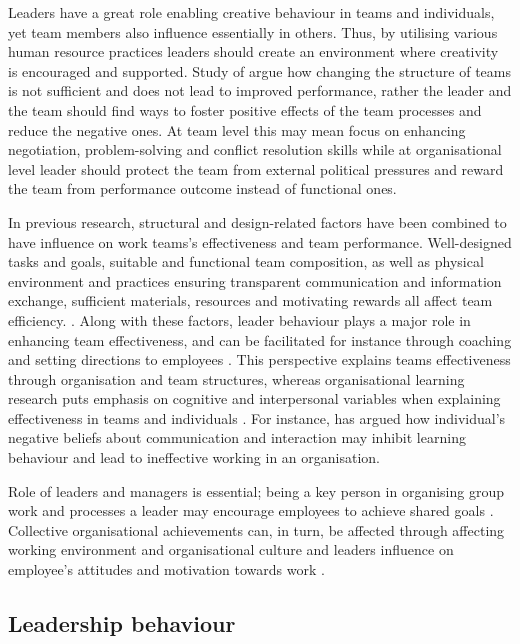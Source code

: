 Leaders have a great role enabling creative behaviour in teams and individuals, yet team members also influence essentially in others. Thus, by utilising various human resource practices leaders should create an environment where creativity is encouraged and supported. \citep{shalley2004leaders} Study of \citet{ancona1992demography} argue how changing the structure of teams is not sufficient and does not lead to improved performance, rather the leader and the team should find ways to foster positive effects of the team processes and reduce the negative ones. At team level this may mean focus on enhancing negotiation, problem-solving and conflict resolution skills while at organisational level leader should protect the team from external political pressures and reward the team from performance outcome instead of functional ones. \citep{ancona1992demography}

In previous research, structural and design-related factors have been combined to have influence on work teams's effectiveness and team performance. Well-designed tasks and goals, suitable and functional team composition, as well as physical environment and practices ensuring transparent communication and information exchange, sufficient materials, resources and motivating rewards all affect team efficiency. \citep{hackman1987design,goodman1988groups,campion1993relations}. Along with these factors, leader behaviour plays a major role in enhancing team effectiveness, and can be facilitated for instance through coaching and setting directions to employees \citep{hackman1987design}. This perspective explains teams effectiveness through organisation and team structures, whereas organisational learning research puts emphasis on cognitive and interpersonal variables when explaining effectiveness in teams and individuals \citep{edmondson1999psychological}. For instance, \citet{argyris1993knowledge} has argued how individual's negative beliefs about communication and interaction may inhibit learning behaviour and lead to ineffective working in an organisation. 

Role of leaders and managers is essential; being a key person in organising group work and processes a leader may encourage employees to achieve shared goals \citep{amabile1998kill}. Collective organisational achievements can, in turn, be affected through affecting working environment and organisational culture and leaders influence on employee's attitudes and motivation towards work \citep{amabile1998kill}.

\subsection{Leadership behaviour}

